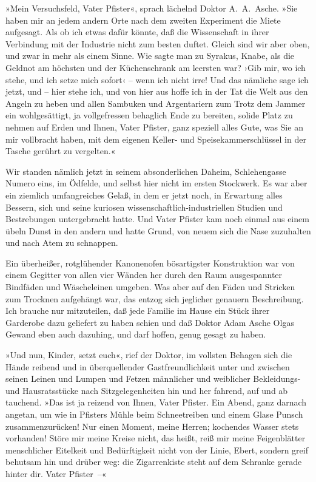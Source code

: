 »Mein Versuchsfeld, Vater Pfister«, sprach lächelnd Doktor
A.~A.~Asche. »Sie haben mir an jedem andern Orte nach dem zweiten
Experiment die Miete aufgesagt. Als ob ich etwas dafür könnte, daß
die Wissenschaft in ihrer Verbindung mit der Industrie nicht zum
besten duftet. Gleich sind wir aber oben, und zwar in mehr als
einem Sinne. Wie sagte man zu Syrakus, Knabe, als die Geldnot am
höchsten und der Küchenschrank am leersten war? ›Gib mir, wo ich
stehe, und ich setze mich sofort‹ – wenn ich nicht irre! Und das
nämliche sage ich jetzt, und – hier stehe ich, und von hier aus
hoffe ich in der Tat die Welt aus den Angeln zu heben und allen
Sambuken und Argentariern zum Trotz dem Jammer ein wohlgesättigt,
ja vollgefressen behaglich Ende zu bereiten, solide Platz zu nehmen
auf Erden und Ihnen, Vater Pfister, ganz speziell alles Gute, was
Sie an mir vollbracht haben, mit dem eigenen Keller- und
Speisekammerschlüssel in der Tasche gerührt zu vergelten.«

Wir standen nämlich jetzt in seinem absonderlichen Daheim,
Schlehengasse Numero eins, im Ödfelde, und selbst hier nicht im
ersten Stockwerk. Es war aber ein ziemlich umfangreiches Gelaß, in
dem er jetzt noch, in Erwartung alles Bessern, sich und seine
kuriosen wissenschaftlich-industriellen Studien und Bestrebungen
untergebracht hatte. Und Vater Pfister kam noch einmal aus einem
übeln Dunst in den andern und hatte Grund, von neuem sich die Nase
zuzuhalten und nach Atem zu schnappen.

Ein überheißer, rotglühender Kanonenofen bösartigster Konstruktion
war von einem Gegitter von allen vier Wänden her durch den Raum
ausgespannter Bindfäden und Wäscheleinen umgeben. Was aber auf den
Fäden und Stricken zum Trocknen aufgehängt war, das entzog sich
jeglicher genauern Beschreibung. Ich brauche nur mitzuteilen, daß
jede Familie im Hause ein Stück ihrer Garderobe dazu geliefert zu
haben schien und daß Doktor Adam Asche Olgas Gewand eben auch
dazuhing, und darf hoffen, genug gesagt zu haben.

»Und nun, Kinder, setzt euch«, rief der Doktor, im vollsten Behagen
sich die Hände reibend und in überquellender Gastfreundlichkeit
unter und zwischen seinen Leinen und Lumpen und Fetzen männlicher
und weiblicher Bekleidungs- und Hausratsstücke nach
Sitzgelegenheiten hin und her fahrend, auf und ab tauchend. »Das
ist ja reizend von Ihnen, Vater Pfister. Ein Abend, ganz darnach
angetan, um wie in Pfisters Mühle beim Schneetreiben und einem
Glase Punsch zusammenzurücken! Nur einen Moment, meine Herren;
kochendes Wasser stets vorhanden! Störe mir meine Kreise nicht, das
heißt, reiß mir meine Feigenblätter menschlicher Eitelkeit und
Bedürftigkeit nicht von der Linie, Ebert, sondern greif behutsam
hin und drüber weg: die Zigarrenkiste steht auf dem Schranke gerade
hinter dir. Vater Pfister~–«

